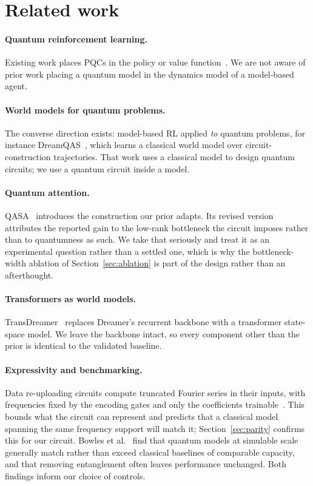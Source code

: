 \documentclass[11pt,onecolumn]{article}
\newif\ifdraft
\newcommand{\pend}[1]{%
  \ifdraft\textcolor{PendFG}{\textbf{[}\textit{#1}\textbf{]}}\fi}
\begin{document}
\section{Related work}
\paragraph{Quantum reinforcement learning.}
Existing work places PQCs in the policy or value
function~\cite{chen2020,skolik2023}. We are not aware of prior work
placing a quantum model in the dynamics model of a model-based agent.
\pend{Appendix~\ref{app:novelty}: databases, search strings, dates}

\paragraph{World models for quantum problems.}
The converse direction exists: model-based RL applied \emph{to} quantum
problems, for instance DreamQAS~\cite{dreamqas}, which learns a
classical world model over circuit-construction trajectories. That work
uses a classical model to design quantum circuits; we use a quantum
circuit inside a model.

\paragraph{Quantum attention.}
QASA~\cite{qasa} introduces the construction our prior adapts. Its
revised version attributes the reported gain to the low-rank bottleneck
the circuit imposes rather than to quantumness as such. We take that
seriously and treat it as an experimental question rather than a
settled one, which is why the bottleneck-width ablation of
Section~\ref{sec:ablation} is part of the design rather than an
afterthought.

\paragraph{Transformers as world models.}
TransDreamer~\cite{transdreamer} replaces Dreamer's recurrent backbone
with a transformer state-space model. We leave the backbone intact, so
every component other than the prior is identical to the validated
baseline.

\paragraph{Expressivity and benchmarking.}
Data re-uploading circuits compute truncated Fourier series in their
inputs, with frequencies fixed by the encoding gates and only the
coefficients trainable~\cite{schuld2021}. This bounds what the circuit
can represent and predicts that a classical model spanning the same
frequency support will match it; Section~\ref{sec:parity} confirms this
for our circuit. Bowles et al.~\cite{bowles2024} find that quantum
models at simulable scale generally match rather than exceed classical
baselines of comparable capacity, and that removing entanglement often
leaves performance unchanged. Both findings inform our choice of
controls.
\end{document}
